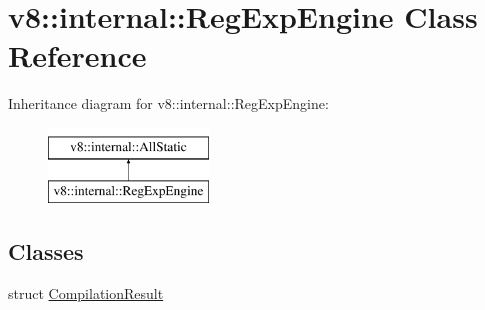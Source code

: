 \hypertarget{classv8_1_1internal_1_1RegExpEngine}{}\section{v8\+:\+:internal\+:\+:Reg\+Exp\+Engine Class Reference}
\label{classv8_1_1internal_1_1RegExpEngine}
Inheritance diagram for v8\+:\+:internal\+:\+:Reg\+Exp\+Engine\+:\begin{figure}[H]
\begin{center}
\leavevmode
\includegraphics[height=2.000000cm]{classv8_1_1internal_1_1RegExpEngine}
\end{center}
\end{figure}
\subsection*{Classes}
\begin{DoxyCompactItemize}
\item 
struct \mbox{\hyperlink{structv8_1_1internal_1_1RegExpEngine_1_1CompilationResult}{Compilation\+Result}}
\end{DoxyCompactItemize}
